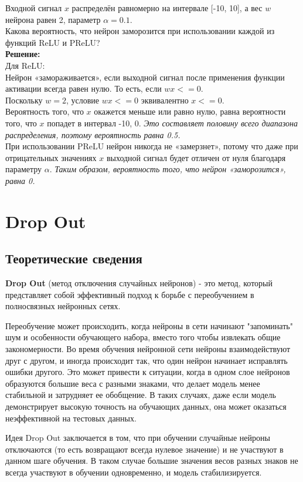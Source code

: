 Входной сигнал $x$ распределён равномерно на интервале [-10, 10], а вес $w$ нейрона равен 2, параметр $\alpha = 0.1$.\\
Какова вероятность, что нейрон заморозится при использовании каждой из функций ReLU и PReLU?\\
\textbf{Решение:}\\
Для ReLU:\\
Нейрон «замораживается», если выходной сигнал после применения функции активации всегда равен нулю. То есть, если $wx <= 0$.\\
Поскольку $w = 2$, условие $wx <= 0$ эквивалентно $x <= 0$.\\
Вероятность того, что $x$ окажется меньше или равно нулю, равна вероятности того, что $x$ попадет в интервал -10, 0. \textit{Это составляет половину всего диапазона распределения, поэтому вероятность равна 0.5.}\\
При использовании PReLU нейрон никогда не «замерзнет», потому что даже при отрицательных значениях $x$ выходной сигнал будет отличен от нуля благодаря параметру $\alpha$.
\textit{Таким образом, вероятность того, что нейрон «заморозится», равна 0.}

\section{Drop Out}
\subsection{Теоретические сведения}

\textbf{Drop Out} (метод отключения случайных нейронов) - это метод, который представляет собой эффективный подход к борьбе с переобучением в полносвязных нейронных сетях. 

Переобучение может происходить, когда нейроны в сети начинают "запоминать" шум и особенности обучающего набора, вместо того чтобы извлекать общие закономерности. Во время обучения нейронной сети нейроны взаимодействуют друг с другом, и иногда происходит так, что один нейрон начинает исправлять ошибки другого. Это может привести к ситуации, когда в одном слое нейронов образуются большие веса с разными знаками, что делает модель менее стабильной и затрудняет ее обобщение. В таких случаях, даже если модель демонстрирует высокую точность на обучающих данных, она может оказаться неэффективной на тестовых данных.

Идея Drop Out заключается в том, что при обучении случайные нейроны отключаются (то есть возвращают всегда нулевое значение) и не участвуют в данном шаге обучения. В таком случае большие значения весов разных знаков не всегда участвуют в обучении одновременно, и модель стабилизируется.

